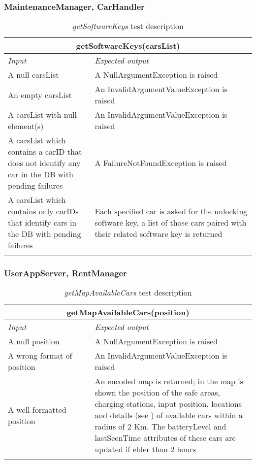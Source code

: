 \subsubsection{MaintenanceManager, CarHandler}
\begin{longtable}{p{0.35\linewidth}p{0.65\linewidth}}
\multicolumn{2}{c}{\textbf{getSoftwareKeys(carsList)}} \\
\toprule
\emph{Input} & \emph{Expected output} \\
\midrule
A null carsList & A NullArgumentException is raised\\
\midrule
An empty carsList & An InvalidArgumentValueException is raised \\
\midrule
A carsList with null element(s) & An InvalidArgumentValueException is raised\\
\midrule
A carsList which contains a carID that does not identify any car in the DB with pending failures & A FailureNotFoundException is raised \\
\midrule
A carsList which contains only carIDs that identify cars in the DB with pending failures & Each specified car is asked for the unlocking software key, a list of those cars paired with their related software key is returned\\
\bottomrule
\caption{\emph{getSoftwareKeys} test description}
\end{longtable}

\subsubsection{UserAppServer, RentManager}

\begin{longtable}{p{0.35\linewidth}p{0.65\linewidth}}
\multicolumn{2}{c}{\textbf{getMapAvailableCars(position)}} \\
\toprule
\emph{Input} & \emph{Expected output} \\
\midrule
A null position & A NullArgumentException is raised\\
\midrule
A wrong format of position & An InvalidArgumentValueException is raised \\
\midrule
A well-formatted position & An encoded map is returned; in the map is shown the position of the safe areas, charging stations, input position, locations and details (see \cite{DD}) of available cars within a radius of 2 Km. The batteryLevel and lastSeenTime attributes of these cars are updated if elder than 2 hours\\
\bottomrule
\caption{\emph{getMapAvailableCars} test description}
\end{longtable}

